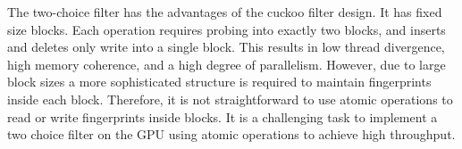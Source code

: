 The two-choice filter has the advantages of the cuckoo filter design. It has
fixed size blocks. Each operation requires probing into exactly two blocks, and
inserts and deletes only write into a single block. This results in low thread
divergence, high memory coherence, and a high degree of parallelism. However,
due to large block sizes a more sophisticated structure is required to maintain
fingerprints inside each block. Therefore, it is not straightforward to use
atomic operations to read or write fingerprints inside blocks. It is a
challenging task to implement a two choice filter on the GPU using atomic
operations to achieve high throughput.

\fi
